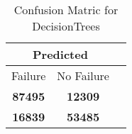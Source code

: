 \begin{table}[] 
\label{Table: Prediction Accuracy-DMDDecisionTreesOnlySunEKF-ignoreReflection-Reflection} 
\caption{Confusion Matric for DecisionTrees} 
\centering 
\begin{tabular} 
 {@{}ccc@{}} 
\toprule 
\multicolumn{2}{c}{\textbf{Predicted}}
 \\ \midrule 
\multicolumn{1}{|c|}{Failure} & 
\multicolumn{1}{c|}{No Failure}
 \\ \midrule 
\multicolumn{1}{|c|}{\color{green}\textbf{87495}} & 
\multicolumn{1}{c|}{\color{red}\textbf{12309}}
 \\ \midrule 
\multicolumn{1}{|c|}{\color{red}\textbf{16839}} & 
\multicolumn{1}{c|}{\color{green}\textbf{53485}}
 \\ \bottomrule 
\end{tabular} 
\end{table} 
